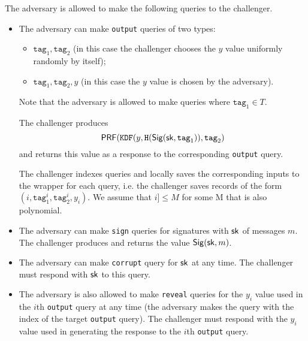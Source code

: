 \documentclass{article}
\begin{document}


The adversary is allowed to make the following queries to the challenger.


\begin{itemize}
	
	\item The adversary can make \texttt{output} queries of two types:
	\begin{itemize}
		\item $\texttt{tag}_1, \texttt{tag}_2$ (in this case the challenger chooses the $y$ value uniformly randomly by itself);
		\item $\texttt{tag}_1, \texttt{tag}_2,y$ (in this case the $y$ value is chosen by the adversary).
	\end{itemize}
	
	Note that the adversary is allowed to make queries where $\texttt{tag}_1 \in T$. 
	
	The challenger produces $$
	\mathsf{PRF}(\texttt{KDF}(y, \texttt{H}(\mathsf{Sig} (\mathsf{sk},\texttt{tag}_1)), \texttt{tag}_2 )
	$$
	and returns this value as a response to the corresponding \texttt{output} query.
	
	The challenger indexes queries and locally saves the corresponding inputs to the wrapper for each query, i.e. the challenger saves records of the form $(i,\texttt{tag}_1^i,\texttt{tag}_2^i,y_i)$.  We assume that $i ]\le M$ for some M that is also polynomial.
	
	\item The adversary can make \texttt{sign} queries for signatures with $\mathsf{sk}$ of messages $m$. The challenger produces and returns the value $\mathsf{Sig} (\mathsf{sk}, m)$.
	
	\item The adversary can make \texttt{corrupt} query for $\mathsf{sk}$ at any time. The challenger must respond with $\mathsf{sk}$ to this query.
	
	\item The adversary is also allowed to make \texttt{reveal} queries for the $y_i$ value used in the $i$th \texttt{output} query at any time (the adversary makes the query with the index of the target \texttt{output} query). The challenger must respond with the $y_i$ value used in generating the response to the $i$th \texttt{output} query.
	

\end{itemize}
\end{document}
